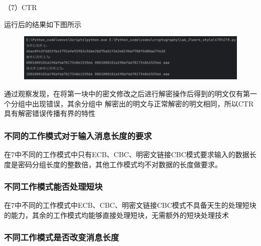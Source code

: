 \documentclass[a4paper,11pt,UTF8]{ctexart}
\newcommand{\bottomcaption}{%
\setlength{\abovecaptionskip}{6pt}%
\setlength{\belowcaptionskip}{6pt}%
\caption}
\newcommand{\xiaowuhao}{\fontsize{9pt}{\baselineskip}\selectfont}   %
\begin{document}
            （7）CTR\par
                运行后的结果如下图所示
                \begin{figure}[H]
                    \centering
                    \includegraphics[width=13cm]{CTR_result_3.png}
                    \bottomcaption{\xiaowuhao{CTR修改一位密文后两次加密结果}}
                \end{figure}
                通过观察发现，在将第一块中的密文修改之后进行解密操作后得到的明文仅有第一个分组中出现错误，其余分组中
                解密出的明文与正常解密的明文相同，所以CTR具有解密错误传播有界的特性

        \subsubsection{不同的工作模式对于输入消息长度的要求}
            在7中不同的工作模式中只有ECB、CBC、明密文链接CBC模式要求输入的数据长度是密码分组长度的整数倍，其他工作模式均不对数据的长度做要求。

        \subsubsection{不同工作模式能否处理短块}
            在7中不同的工作模式中ECB、CBC、明密文链接CBC模式不具备天生的处理短块的能力，其余的工作模式均能够直接处理短块，无需额外的短块处理技术

        \subsubsection{不同工作模式是否改变消息长度}
\end{document}
